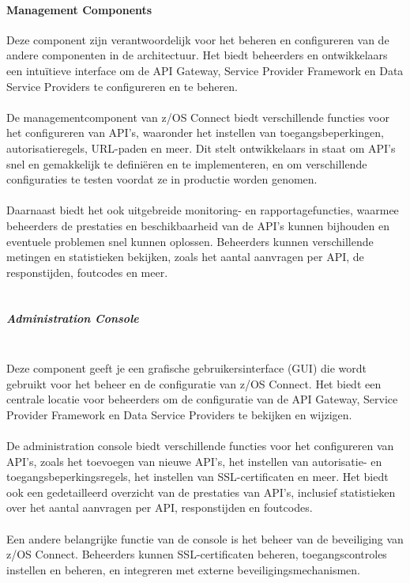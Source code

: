 \paragraph{Management Components}
Deze component zijn verantwoordelijk voor het beheren en configureren van de andere componenten in de architectuur. Het biedt beheerders en ontwikkelaars een intuïtieve interface om de API Gateway, Service Provider Framework en Data Service Providers te configureren en te beheren. \autocite{IBM2023a}
\\ \\
De managementcomponent van z/OS Connect biedt verschillende functies voor het configureren van API's, waaronder het instellen van toegangsbeperkingen, autorisatieregels, URL-paden en meer. Dit stelt ontwikkelaars in staat om API's snel en gemakkelijk te definiëren en te implementeren, en om verschillende configuraties te testen voordat ze in productie worden genomen. \autocite{IBM2023a}
\\ \\
Daarnaast biedt het ook uitgebreide monitoring- en rapportagefuncties, waarmee beheerders de prestaties en beschikbaarheid van de API's kunnen bijhouden en eventuele problemen snel kunnen oplossen. Beheerders kunnen verschillende metingen en statistieken bekijken, zoals het aantal aanvragen per API, de responstijden, foutcodes en meer. \autocite{IBM2023a}
\\ \\
\subparagraph{Administration Console} \mbox{} \\
Deze component geeft je een grafische gebruikersinterface (GUI) die wordt gebruikt voor het beheer en de configuratie van z/OS Connect. Het biedt een centrale locatie voor beheerders om de configuratie van de API Gateway, Service Provider Framework en Data Service Providers te bekijken en wijzigen. \autocite{IBM2023a}
\\ \\
De administration console biedt verschillende functies voor het configureren van API's, zoals het toevoegen van nieuwe API's, het instellen van autorisatie- en toegangsbeperkingsregels, het instellen van SSL-certificaten en meer. Het biedt ook een gedetailleerd overzicht van de prestaties van API's, inclusief statistieken over het aantal aanvragen per API, responstijden en foutcodes. \autocite{IBM2023a}
\\ \\
Een andere belangrijke functie van de console is het beheer van de beveiliging van z/OS Connect. Beheerders kunnen SSL-certificaten beheren, toegangscontroles instellen en beheren, en integreren met externe beveiligingsmechanismen. \autocite{IBM2023a}
